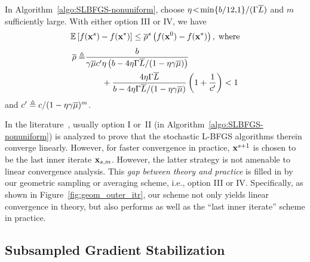 \documentclass[10pt,twocolumn,journal]{IEEEtran}
\begin{document}
\begin{prop}\label{prop:exp_samp_ave}
In Algorithm~\ref{algo:SLBFGS-nonuniform}, choose $\eta\!<\!\min\{b/12,\!1\}/(\Gamma\overline{L})$ and $m$ sufficiently large. With either option III or IV, we have
\begin{equation}
\bbE\left[f(\bx^s)-f(\bx^*)\right] \le \barrho^s\left(f(\bx^0)-f(\bx^*)\right),\;\mbox{where}\vspace{-.4cm}\label{eq:faster_linear_conv}
\end{equation}
\begin{align}
\overline{\rho} \triangleq &\frac{b}{\gamma\overline{\mu} c'\eta\left(b-4\eta\Gamma\overline{L}/(1-\eta\gamma\overline{\mu})\right)}\nonumber\\
&\quad\quad+\frac{4\eta\Gamma\overline{L}}{b-4\eta\Gamma\overline{L}/(1-\eta\gamma\overline{\mu})}\left(1+\frac{1}{c'}\right) < 1 \label{eq:barrho}
\end{align}
and $c'\triangleq c/(1-\eta\gamma\overline{\mu})^m$. %
\end{prop}


\begin{remark}\label{rmk:exp_samp_ave}
In the literature~\cite{Moritz_16,Gower_16}, usually option I or~II (in Algorithm~\ref{algo:SLBFGS-nonuniform}) is analyzed   to prove that the stochastic L-BFGS algorithms therein converge linearly. However, for faster convergence in practice, $\mathbf{x}^{s+1}$ is chosen to be the last inner iterate $\mathbf{x}_{s,m}$. %
 However, the latter strategy is not amenable to linear convergence analysis. This {\em gap between theory and practice} is filled in by our geometric sampling or averaging scheme, i.e., option III or IV. Specifically, as shown in Figure~\ref{fig:geom_outer_itr}, our scheme not only yields linear convergence in theory, but also performs as well as the ``last inner iterate'' scheme in practice. %
\end{remark}

\subsection{Subsampled Gradient Stabilization}\label{sec:subsamp_grad_outer}
\end{document}
